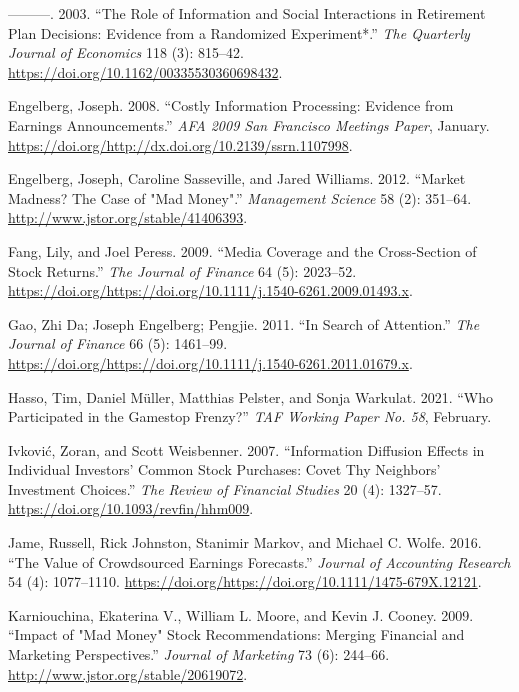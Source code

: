 \documentclass[12pt,]{article}
\begin{document}
\leavevmode\hypertarget{ref-duflo2003}{}%
---------. 2003. ``The Role of Information and Social Interactions in
Retirement Plan Decisions: Evidence from a Randomized Experiment*.''
\emph{The Quarterly Journal of Economics} 118 (3): 815--42.
\url{https://doi.org/10.1162/00335530360698432}.

\leavevmode\hypertarget{ref-engelberg2008}{}%
Engelberg, Joseph. 2008. ``Costly Information Processing: Evidence from
Earnings Announcements.'' \emph{AFA 2009 San Francisco Meetings Paper},
January.
\href{https://doi.org/http://dx.doi.org/10.2139/ssrn.1107998\%20}{https://doi.org/http://dx.doi.org/10.2139/ssrn.1107998}.

\leavevmode\hypertarget{ref-engelberg2012}{}%
Engelberg, Joseph, Caroline Sasseville, and Jared Williams. 2012.
``Market Madness? The Case of "Mad Money".'' \emph{Management Science}
58 (2): 351--64. \url{http://www.jstor.org/stable/41406393}.

\leavevmode\hypertarget{ref-fang2009}{}%
Fang, Lily, and Joel Peress. 2009. ``Media Coverage and the
Cross-Section of Stock Returns.'' \emph{The Journal of Finance} 64 (5):
2023--52.
\url{https://doi.org/https://doi.org/10.1111/j.1540-6261.2009.01493.x}.

\leavevmode\hypertarget{ref-da2011}{}%
Gao, Zhi Da; Joseph Engelberg; Pengjie. 2011. ``In Search of
Attention.'' \emph{The Journal of Finance} 66 (5): 1461--99.
\url{https://doi.org/https://doi.org/10.1111/j.1540-6261.2011.01679.x}.

\leavevmode\hypertarget{ref-hasso2021}{}%
Hasso, Tim, Daniel Müller, Matthias Pelster, and Sonja Warkulat. 2021.
``Who Participated in the Gamestop Frenzy?'' \emph{TAF Working Paper No.
58}, February.

\leavevmode\hypertarget{ref-ivkovic2007}{}%
Ivković, Zoran, and Scott Weisbenner. 2007. ``Information Diffusion
Effects in Individual Investors' Common Stock Purchases: Covet Thy
Neighbors' Investment Choices.'' \emph{The Review of Financial Studies}
20 (4): 1327--57. \url{https://doi.org/10.1093/revfin/hhm009}.

\leavevmode\hypertarget{ref-jame2016}{}%
Jame, Russell, Rick Johnston, Stanimir Markov, and Michael C. Wolfe.
2016. ``The Value of Crowdsourced Earnings Forecasts.'' \emph{Journal of
Accounting Research} 54 (4): 1077--1110.
\url{https://doi.org/https://doi.org/10.1111/1475-679X.12121}.

\leavevmode\hypertarget{ref-karniouchina2009}{}%
Karniouchina, Ekaterina V., William L. Moore, and Kevin J. Cooney. 2009.
``Impact of "Mad Money" Stock Recommendations: Merging Financial and
Marketing Perspectives.'' \emph{Journal of Marketing} 73 (6): 244--66.
\url{http://www.jstor.org/stable/20619072}.
\end{document}
